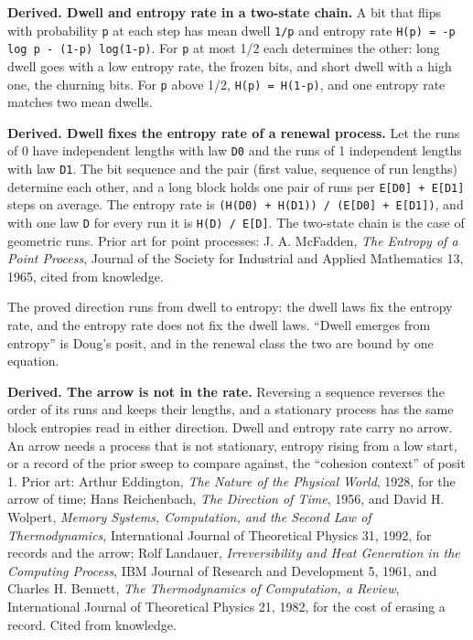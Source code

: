 \textbf{Derived. Dwell and entropy rate in a two-state chain.} A bit that flips with probability \texttt{p} at each step has mean dwell \texttt{1/\allowbreak{}p} and entropy rate \texttt{H(p) = -\allowbreak{}p log p -\allowbreak{} (1-\allowbreak{}p) log(1-\allowbreak{}p)}. For \texttt{p} at most 1/2 each determines the other: long dwell goes with a low entropy rate, the frozen bits, and short dwell with a high one, the churning bits. For \texttt{p} above 1/2, \texttt{H(p) = H(1-\allowbreak{}p)}, and one entropy rate matches two mean dwells.

\textbf{Derived. Dwell fixes the entropy rate of a renewal process.} Let the runs of 0 have independent lengths with law \texttt{D0} and the runs of 1 independent lengths with law \texttt{D1}. The bit sequence and the pair (first value, sequence of run lengths) determine each other, and a long block holds one pair of runs per \texttt{E[D0] + E[D1]} steps on average. The entropy rate is \texttt{(H(D0) + H(D1)) /\allowbreak{} (E[D0] + E[D1])}, and with one law \texttt{D} for every run it is \texttt{H(D) /\allowbreak{} E[D]}. The two-state chain is the case of geometric runs. Prior art for point processes: J. A. McFadden, \emph{The Entropy of a Point Process}, Journal of the Society for Industrial and Applied Mathematics 13, 1965, cited from knowledge.

The proved direction runs from dwell to entropy: the dwell laws fix the entropy rate, and the entropy rate does not fix the dwell laws. “Dwell emerges from entropy” is Doug's posit, and in the renewal class the two are bound by one equation.

\textbf{Derived. The arrow is not in the rate.} Reversing a sequence reverses the order of its runs and keeps their lengths, and a stationary process has the same block entropies read in either direction. Dwell and entropy rate carry no arrow. An arrow needs a process that is not stationary, entropy rising from a low start, or a record of the prior sweep to compare against, the “cohesion context” of posit 1. Prior art: Arthur Eddington, \emph{The Nature of the Physical World}, 1928, for the arrow of time; Hans Reichenbach, \emph{The Direction of Time}, 1956, and David H. Wolpert, \emph{Memory Systems, Computation, and the Second Law of Thermodynamics}, International Journal of Theoretical Physics 31, 1992, for records and the arrow; Rolf Landauer, \emph{Irreversibility and Heat Generation in the Computing Process}, IBM Journal of Research and Development 5, 1961, and Charles H. Bennett, \emph{The Thermodynamics of Computation, a Review}, International Journal of Theoretical Physics 21, 1982, for the cost of erasing a record. Cited from knowledge.

